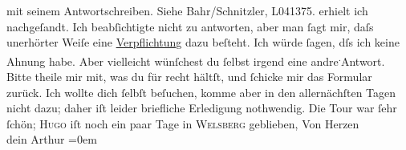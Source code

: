 \begin{ledgroupsized}[t]{13cm}
{{{                  mit seinem Antwortschreiben. Siehe Bahr/Schnitzler, L041375.}}}\label{K_L01229-1h} erhielt ich nachgeſandt. Ich beabſichtigte nicht zu
               antworten, aber man ſagt mir, daſs unerhörter Weiſe eine \uline{Verpflichtung} dazu beſteht. Ich würde ſagen, dſs ich keine Ahnung habe. Aber
               vielleicht wünſchest du ſelbst irgend eine andre\substVorne{}\textsuperscript{.}\substDazwischen{}{ }Antwort.\substHinten{} Bitte theile mir mit, was {\pb}du für recht  hältſt,
               und ſchicke mir das Formular zurück.\pend
           \pstart
           Ich wollte dich ſelbſt beſuchen, komme aber in den allernächſten Tagen nicht dazu;
               daher iſt leider briefliche Erledigung nothwendig.\pend
           \pstart
           Die Tour war ſehr ſchön; \textsc{Hugo} iſt noch ein paar Tage in \textsc{Welsberg} geblieben,\pend
           \pstart
           Von Herzen{\\[\baselineskip]}dein \spacefill\mbox{Arthur}\pend
           \leftskip=0em{}
         
         \endnumbering{}\end{ledgroupsized}  \newcommand{\dateiname}{L01229}\newcommand{\titel}{Arthur Schnitzler an Hermann Bahr, [9. 7. 1902]}\newcommand{\editorInnen}{ Kurt Ifkovits,  Martin Anton Müller}
      